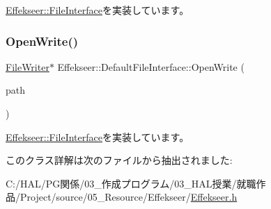 \mbox{\hyperlink{class_effekseer_1_1_file_interface_ad8744ad57226d9a2ce74f6ef6e2f9a41}{Effekseer\+::\+File\+Interface}}を実装しています。

\mbox{\label{class_effekseer_1_1_default_file_interface_aecbcd4350ca701360dcea88a2c5f9c64}} 
\subsubsection{\texorpdfstring{Open\+Write()}{OpenWrite()}}
{\footnotesize\ttfamily \mbox{\hyperlink{class_effekseer_1_1_file_writer}{File\+Writer}}$\ast$ Effekseer\+::\+Default\+File\+Interface\+::\+Open\+Write (\begin{DoxyParamCaption}\item[{const \mbox{\hyperlink{_effekseer_8h_a50b026abea014b47854bcd835b3b6233}{E\+F\+K\+\_\+\+C\+H\+AR}} $\ast$}]{path }\end{DoxyParamCaption})\hspace{0.3cm}{\ttfamily [virtual]}}



\mbox{\hyperlink{class_effekseer_1_1_file_interface_a1e60cb81a5cae39b37e44570ef693d91}{Effekseer\+::\+File\+Interface}}を実装しています。



このクラス詳解は次のファイルから抽出されました\+:\begin{DoxyCompactItemize}
\item 
C\+:/\+H\+A\+L/\+P\+G関係/03\+\_\+作成プログラム/03\+\_\+\+H\+A\+L授業/就職作品/\+Project/source/05\+\_\+\+Resource/\+Effekseer/\mbox{\hyperlink{_effekseer_8h}{Effekseer.\+h}}\end{DoxyCompactItemize}
